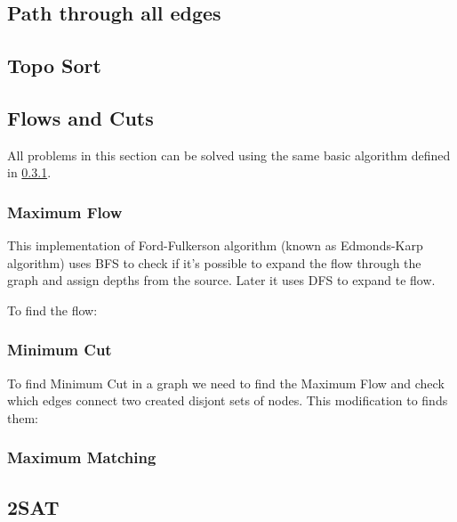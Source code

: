 \documentclass[13pt]{article}
\begin{document}
\subsection{Path through all edges}\label{sub:} %


\pagebreak

\subsection{Topo Sort}\label{sub:topo_sort} %


\subsection{Flows and Cuts}
All problems in this section can be solved using the same basic algorithm defined in \ref{sec:MAXFLOW}.

\subsubsection{Maximum Flow}
\label{sec:MAXFLOW}
This implementation of Ford-Fulkerson algorithm (known as Edmonds-Karp algorithm) uses BFS to check if it's possible to expand the flow through the graph and assign depths from the source. Later it uses DFS to expand te flow.


To find the flow:


\subsubsection{Minimum Cut}
To find Minimum Cut in a graph we need to find the Maximum Flow and check which edges connect two created disjont sets of nodes. This modification to finds them:

\subsubsection{Maximum Matching}

\subsection{2SAT}
\end{document}

